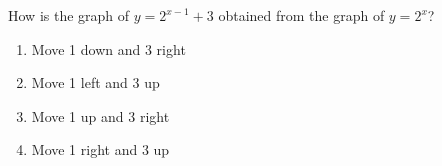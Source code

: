 \bigskip

\item  How is the graph of $y=2^{x-1}+3$ obtained from the graph of $y=2^x$?

    \begin{enumerate}
    \item Move 1 down and 3 right
    \item Move 1 left and 3 up
    \item Move 1 up and 3 right
    \item Move 1 right and 3 up
    \end{enumerate}


